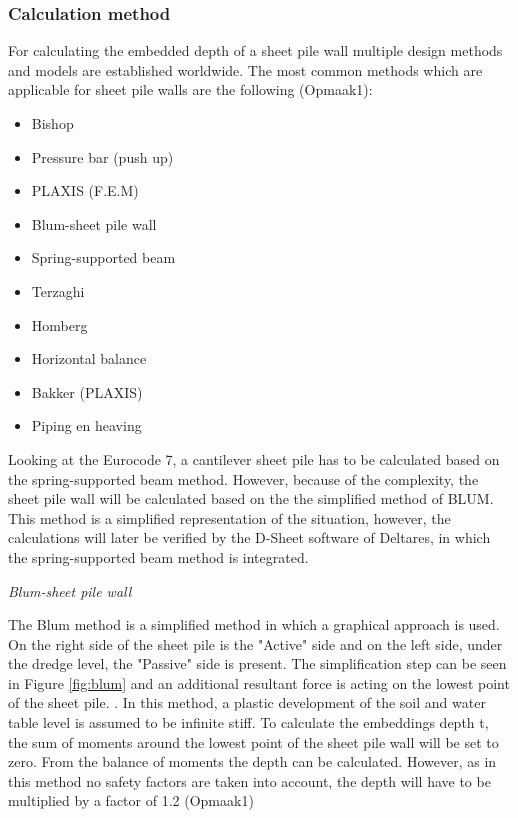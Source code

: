 \subsubsection{Calculation method}

For calculating the embedded depth of a sheet pile wall multiple design methods and models are established worldwide. The most common methods which are applicable for sheet pile walls are the following (Opmaak1):

\begin{itemize}
  \item Bishop
  \item Pressure bar (push up)
  \item PLAXIS (F.E.M)
  \item Blum-sheet pile wall
  \item Spring-supported beam
  \item Terzaghi
  \item Homberg
  \item Horizontal balance
  \item Bakker (PLAXIS)
  \item Piping en heaving
\end{itemize}

Looking at the Eurocode 7, a cantilever sheet pile has to be calculated based on the spring-supported beam method. However, because of the complexity, the sheet pile wall will be calculated based on the the simplified method of BLUM. This method is a simplified representation of the situation, however, the calculations will later be verified by the D-Sheet software of Deltares, in which the spring-supported beam method is integrated.

\textit{Blum-sheet pile wall}

The Blum method is a simplified method in which a graphical approach is used. On the right side of the sheet pile is the "Active" side and on the left side, under the dredge level, the "Passive" side is present. The simplification step can be seen in Figure \ref{fig:blum} and an additional resultant force is acting on the lowest point of the sheet pile. . In this method, a plastic development of the soil and water table level is assumed to be infinite stiff. To calculate the embeddings depth t, the sum of moments around the lowest point of the sheet pile wall will be set to zero. From the balance of moments the depth can be calculated. However, as in this method no safety factors are taken into account, the depth will have to be multiplied by a factor of 1.2 (Opmaak1)

